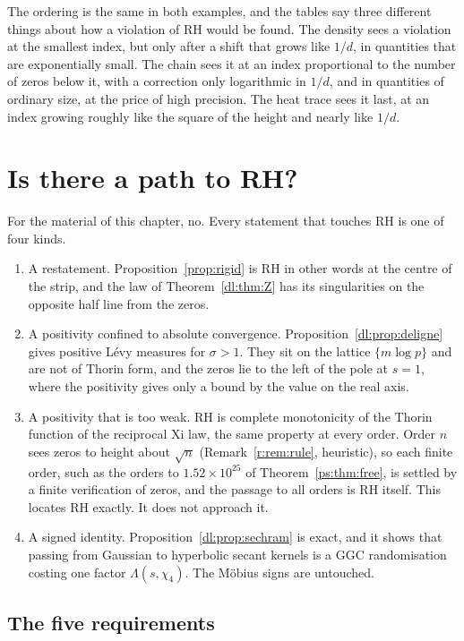The ordering is the same in both examples, and the tables say three different things about how a violation of RH would be found. The density sees a violation at the smallest index, but only after a shift that grows like $1/d$, in quantities that are exponentially small. The chain sees it at an index proportional to the number of zeros below it, with a correction only logarithmic in $1/d$, and in quantities of ordinary size, at the price of high precision. The heat trace sees it last, at an index growing roughly like the square of the height and nearly like $1/d$.

\section{Is there a path to RH?}\label{r:sec:path}

For the material of this chapter, no. Every statement that touches RH is one of four kinds.

\begin{enumerate}
\item A restatement. Proposition~\ref{prop:rigid} is RH in other words at the centre of the strip, and the law of Theorem~\ref{dl:thm:Z} has its singularities on the opposite half line from the zeros.
\item A positivity confined to absolute convergence. Proposition~\ref{dl:prop:deligne} gives positive L\'evy measures for $\sigma>1$. They sit on the lattice $\{m\log p\}$ and are not of Thorin form, and the zeros lie to the left of the pole at $s=1$, where the positivity gives only a bound by the value on the real axis.
\item A positivity that is too weak. RH is complete monotonicity of the Thorin function of the reciprocal Xi law, the same property at every order. Order $n$ sees zeros to height about $\sqrt n$ (Remark~\ref{r:rem:rule}, heuristic), so each finite order, such as the orders to $1.52\times10^{25}$ of Theorem~\ref{ps:thm:free}, is settled by a finite verification of zeros, and the passage to all orders is RH itself. This locates RH exactly. It does not approach it.
\item A signed identity. Proposition~\ref{dl:prop:sechram} is exact, and it shows that passing from Gaussian to hyperbolic secant kernels is a GGC randomisation costing one factor $\Lambda(s,\chi_4)$. The M\"obius signs are untouched.
\end{enumerate}



\subsection{The five requirements}


